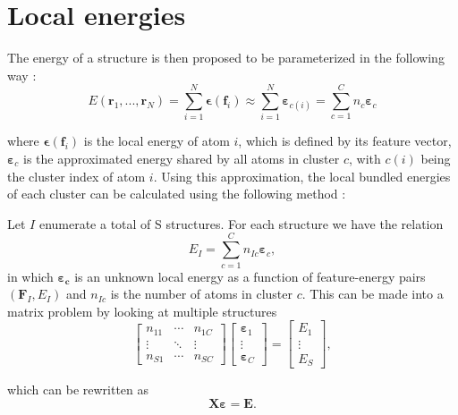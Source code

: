 
\section{Local energies}

The energy of a structure is then proposed to be parameterized in the following way \cite{Meldgaard}:
\begin{equation}
	E(\mathbf{r}_1, ..., \mathbf{r}_N) = \sum_{i = 1}^{N} \bm{\epsilon}(\mathbf{f}_i) \approx \sum_{i=1}^{N}\bm{\varepsilon}_{c(i)} = \sum_{c=1}^{C} n_c \bm{\varepsilon}_c
	\label{eq:Local_energies}
\end{equation}

where $\bm{\epsilon}(\mathbf{f}_i)$ is the local energy of atom $i$, which is defined by its feature vector, $\bm{\varepsilon}_c$ is the approximated energy shared by all atoms in cluster $c$, with $c(i)$ being the cluster index of atom $i$. Using this approximation, the local bundled energies of each cluster can be calculated using the following method \cite{Meldgaard}:

Let $I$ enumerate a total of S structures. For each structure we have the relation
\begin{equation}
	E_I = \sum_{c=1}^C n_{Ic} \bm{\varepsilon}_c,
\end{equation} 
in which $\bm{\varepsilon_c}$ is an unknown local energy as a function of feature-energy pairs $(\mathbf{F}_I, E_I)$ and $n_{Ic}$ is the number of atoms in cluster $c$. This can be made into a matrix problem by looking at multiple structures
\begin{equation}
	\begin{bmatrix}
	n_{11} & \cdots	& n_{1C} \\
	\vdots & \ddots & \vdots \\
	n_{S1} & \cdots & n_{SC} 
	\end{bmatrix}
	\begin{bmatrix}
	\bm{\varepsilon}_1 \\
	\vdots \\
	\bm{\varepsilon}_C
	\end{bmatrix}
	= \begin{bmatrix}
	E_1 \\
	\vdots \\
	E_S
	\end{bmatrix},
	\label{eq:Energy_bundles_matrix}
\end{equation}

which can be rewritten as
\begin{equation}
	\mathbf{X} \bm{\varepsilon} = \mathbf{E}.
	\label{eq:Matrix_problem_rewritten}
\end{equation}

